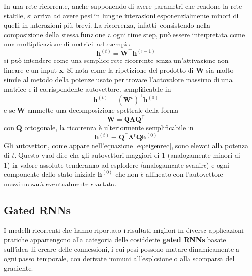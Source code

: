 \documentclass[12pt,a4paper]{report}
\begin{document}
    In una rete ricorrente, anche supponendo di avere parametri che
    rendono la rete stabile, si arriva ad avere pesi in lunghe 
    interazioni esponenzialmente minori di quelli in interazioni pi\`u 
    brevi. La ricorrenza, infatti, consistendo nella composizione della 
    stessa funzione a ogni time step, pu\`o essere interpretata come una
    moltiplicazione di matrici, ad esempio
    \begin{equation}
        \boldsymbol{h}^{(t)}=\boldsymbol{W}^\intercal
        \boldsymbol{h}^{(t-1)}
    \end{equation}
    si pu\`o intendere come una semplice rete ricorrente senza 
    un'attivazione non lineare e un input $\boldsymbol{x}$. Si nota
    come la ripetizione del prodotto di $\boldsymbol{W}$ sia molto
    simile al metodo della potenze usato per trovare l'autovalore 
    massimo di una matrice e il corrispondente autovettore, 
    semplificabile in
    \begin{equation}
        \boldsymbol{h}^{(t)}=(\boldsymbol{W}^t)^\intercal
        \boldsymbol{h}^{(0)}
    \end{equation}
    e se $\boldsymbol{W}$ ammette una decomposizione spettrale della 
    forma
    \begin{equation}
        \boldsymbol{W}=\boldsymbol{Q}\boldsymbol{\Lambda}
        \boldsymbol{Q}^\intercal
    \end{equation}
    con $\boldsymbol{Q}$ ortogonale, la ricorrenza \`e ulteriormente
    semplificabile in
    \begin{equation} \label{eq:eigenrec}
        \boldsymbol{h}^{(t)}=\boldsymbol{Q}^\intercal
        \boldsymbol{\Lambda}^t\boldsymbol{Q}\boldsymbol{h}^{(0)}
    \end{equation}
    Gli autovettori, come appare nell'equazione \ref{eq:eigenrec}, sono
    elevati alla potenza di $t$. Questo vuol dire che gli autovettori
    maggiori di 1 (analogamente minori di 1) in valore assoluto 
    tenderanno ad esplodere (analogamente svanire) e ogni componente
    dello stato iniziale $\boldsymbol{h}^{(0)}$ che non \`e allineato
    con l'autovettore massimo sar\`a eventualmente scartato.

    \subsection{Gated RNNs}
    I modelli ricorrenti che hanno riportato i risultati migliori in
    diverse applicazioni pratiche appartengono alla categoria delle
    cosiddette \textbf{gated RNNs} basate sull'idea di creare delle
    connessioni, i cui pesi possono mutare dinamicamente a ogni passo
    temporale, con derivate immuni all'esplosione o alla scomparsa del 
    gradiente.
\end{document}

